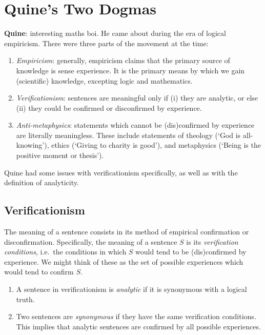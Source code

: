 \chapter{Quine's Two Dogmas}

\textbf{Quine}: interesting maths boi. He came about during the era of logical empiricism. There were three parts of the movement at the time:
\begin{enumerate}[label=(\alph*)]
  \item \emph{Empiricism}: generally, empiricism claims that the primary source of knowledge is sense experience. It is the primary means by which we gain (scientific) knowledge, excepting logic and mathematics.
  \item \emph{Verificationism}: sentences are meaningful only if (i) they are analytic, or else (ii) they could be confirmed or disconfirmed by experience.
  \item \emph{Anti-metaphysics}: statements which cannot be (dis)confirmed by experience are literally meaningless. These include statements of theology (`God is all-knowing'), ethics (`Giving to charity is good'), and metaphysics (`Being is the positive moment or thesis').
\end{enumerate}
Quine had some issues with verificationism specifically, as well as with the definition of analyticity.

\section{Verificationism}

\begin{definition}[Verificationism]
The meaning of a sentence consists in its method of empirical confirmation or disconfirmation. Specifically, the meaning of a sentence $S$ is its \emph{verification conditions}, i.e.\ the conditions in which $S$ would tend to be (dis)confirmed by experience. We might think of these as the set of possible experiences which would tend to confirm $S$.
\begin{enumerate}[label=\roman*.]
  \item A sentence in verificationism is \emph{analytic} if it is synonymous with a logical truth.
  \item Two sentences are \emph{synonymous} if they have the same verification conditions. This implies that analytic sentences are confirmed by all possible experiences.
\end{enumerate}
\end{definition}

